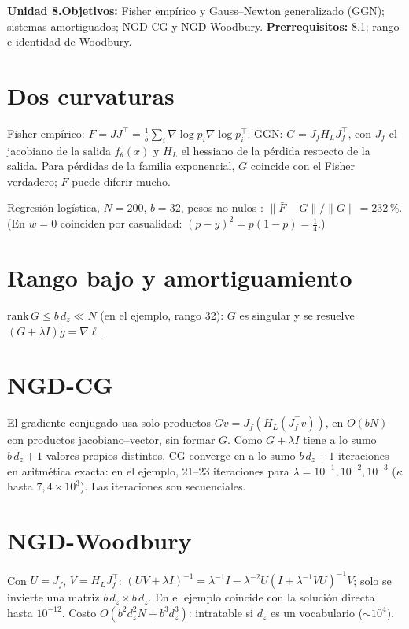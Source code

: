 \documentclass[11pt,a4paper]{article}
\begin{document}

\noindent\textbf{Unidad 8.}\quad\textbf{Objetivos:} Fisher empírico y Gauss--Newton generalizado (GGN); sistemas amortiguados; NGD-CG y NGD-Woodbury.
\textbf{Prerrequisitos:} 8.1; rango e identidad de Woodbury.

\section{Dos curvaturas}
Fisher empírico: $\bar F=JJ^\top=\frac1b\sum_i\nabla\log p_i\nabla\log p_i^\top$. GGN: $G=J_fH_LJ_f^\top$, con $J_f$ el jacobiano de la salida $f_\theta(x)$
y $H_L$ el hessiano de la pérdida respecto de la salida. Para pérdidas de la familia exponencial, $G$ coincide con el Fisher verdadero; $\bar F$ puede diferir mucho.
\begin{ejemplo}
Regresión logística, $N=200$, $b=32$, pesos no nulos \evS: $\|\bar F-G\|/\|G\|=232\,\%$. (En $w=0$ coinciden por casualidad: $(p-y)^2=p(1-p)=\frac14$.)
\end{ejemplo}

\section{Rango bajo y amortiguamiento}
$\mathrm{rank}\,G\le b\,d_z\ll N$ (en el ejemplo, rango 32): $G$ es singular y se resuelve $(G+\lambda I)\tilde g=\nabla\ell$.

\section{NGD-CG}
El gradiente conjugado usa solo productos $Gv=J_f(H_L(J_f^\top v))$, en $O(bN)$ con productos jacobiano--vector, sin formar $G$. Como $G+\lambda I$ tiene a lo sumo
$b\,d_z+1$ valores propios distintos, CG converge en a lo sumo $b\,d_z+1$ iteraciones en aritmética exacta: en el ejemplo, 21--23 iteraciones para
$\lambda=10^{-1},10^{-2},10^{-3}$ ($\kappa$ hasta $7{,}4\times10^3$). Las iteraciones son secuenciales.

\section{NGD-Woodbury}
Con $U=J_f$, $V=H_LJ_f^\top$: $(UV+\lambda I)^{-1}=\lambda^{-1}I-\lambda^{-2}U(I+\lambda^{-1}VU)^{-1}V$; solo se invierte una matriz $b\,d_z\times b\,d_z$. En el ejemplo
coincide con la solución directa hasta $10^{-12}$. Costo $O(b^2d_z^2N+b^3d_z^3)$: intratable si $d_z$ es un vocabulario ($\sim10^4$).
\end{document}
